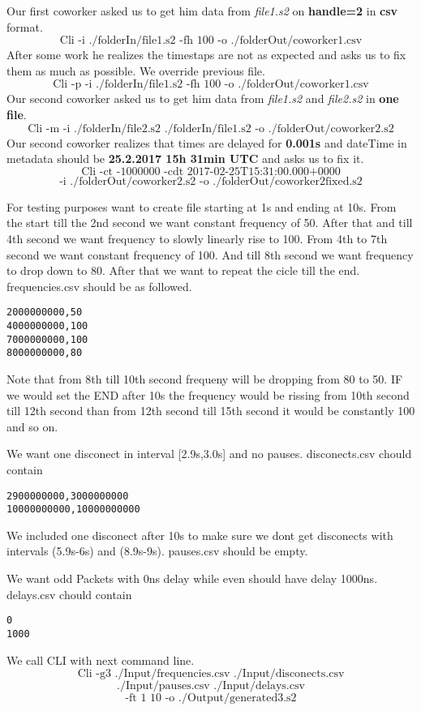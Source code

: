 \documentclass[english]{article}
\begin{document}

Our first coworker asked us to get him data from \textit{file1.s2} on \textbf{handle=2} in \textbf{csv} format.
$$\text{Cli -i ./folderIn/file1.s2  -fh 100 -o ./folderOut/coworker1.csv}$$
After some work he realizes the timestaps are not as expected and asks us to fix them as much as possible. We override previous file.
$$\text{Cli -p -i ./folderIn/file1.s2 -fh 100 -o ./folderOut/coworker1.csv}$$
Our second coworker asked us to get him data from \textit{file1.s2} and \textit{file2.s2} in \textbf{one file}.
$$\text{Cli -m -i ./folderIn/file2.s2 ./folderIn/file1.s2 -o ./folderOut/coworker2.s2}$$
Our second coworker realizes that times are delayed for \textbf{0.001s} and dateTime in metadata should be \textbf{25.2.2017 15h 31min UTC} and asks us to fix it.
$$\text{Cli -ct -1000000 -cdt 2017-02-25T15:31:00.000+0000}$$ $$ \text{-i ./folderOut/coworker2.s2 -o ./folderOut/coworker2fixed.s2}$$

For testing purposes want to create file starting at 1s and ending at 10s. From the start till the 2nd second we want constant frequency of 50. After that and till 4th second we want frequency to slowly linearly rise to 100. From 4th to 7th second we want constant frequency of 100. And till 8th second we want frequency to drop down to 80. After that we want to repeat the cicle till the end. frequencies.csv should be as followed.
\begin{verbatim}
2000000000,50
4000000000,100
7000000000,100
8000000000,80
\end{verbatim}
Note that from 8th till 10th second frequeny will be dropping from 80 to 50. IF we would set the END after 10s the frequency would be rissing from 10th second till 12th second than from 12th second till 15th second it would be constantly 100 and so on.

We want one disconect in interval [2.9s,3.0s] and no pauses. 
disconects.csv chould contain
\begin{verbatim}
2900000000,3000000000
10000000000,10000000000
\end{verbatim}
We included one disconect after 10s to make sure we dont get disconects with intervals (5.9s-6s) and (8.9s-9s).
pauses.csv should be empty.

We want odd Packets with 0ns delay while even should have delay 1000ns.
delays.csv chould contain
\begin{verbatim}
0
1000
\end{verbatim}
We call CLI with next command line.
$$\text{Cli -g3 ./Input/frequencies.csv ./Input/disconects.csv}$$
$$\text{./Input/pauses.csv ./Input/delays.csv}$$
$$\text{-ft 1 10 -o ./Output/generated3.s2} $$
\end{document}
